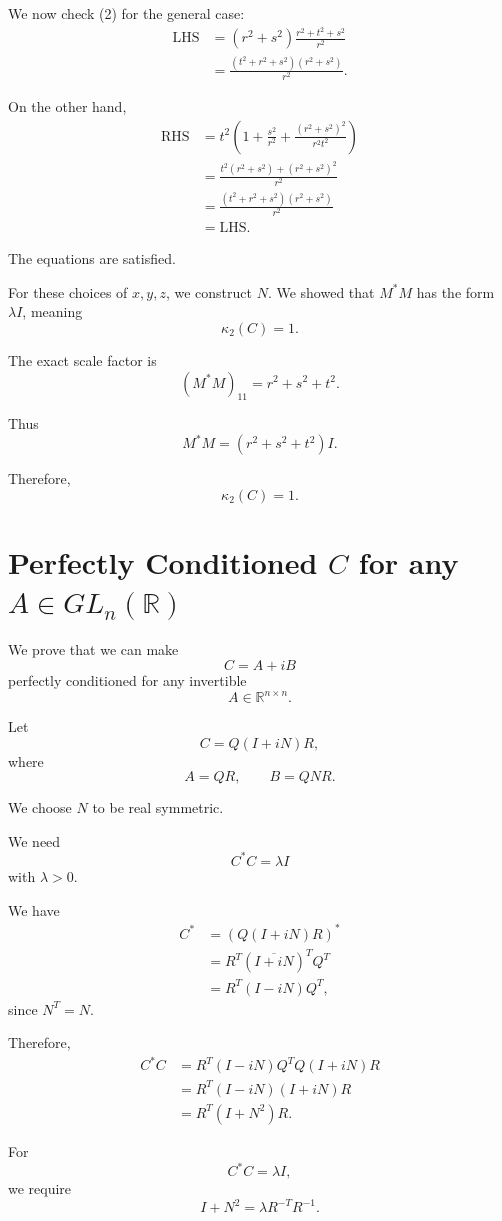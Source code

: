 \documentclass[11pt, reqno, a4paper]{amsart}
\theoremstyle{plain}
\theoremstyle{definition}
\theoremstyle{remark}
\numberwithin{equation}{section}
\begin{document}
We now check (2) for the general case:
\begin{align*}
\text{LHS}
&=
(r^2+s^2)
\frac{r^2+t^2+s^2}{r^2}\\
&=
\frac{(t^2+r^2+s^2)(r^2+s^2)}{r^2}.
\end{align*}

On the other hand,
\begin{align*}
\text{RHS}
&=
t^2\left(
1+\frac{s^2}{r^2}
+\frac{(r^2+s^2)^2}{r^2t^2}
\right)\\
&=
\frac{t^2(r^2+s^2)+(r^2+s^2)^2}{r^2}\\
&=
\frac{(t^2+r^2+s^2)(r^2+s^2)}{r^2}\\
&=\text{LHS}.
\end{align*}

The equations are satisfied.

For these choices of $x,y,z$, we construct $N$. We showed that $M^*M$ has the form $\lambda I$, meaning
\[
\kappa_2(C)=1.
\]

The exact scale factor is
\[
(M^*M)_{11}=r^2+s^2+t^2.
\]

Thus
\[
M^*M=(r^2+s^2+t^2)I.
\]

Therefore,
\[
\boxed{\kappa_2(C)=1.}
\]

\section{Perfectly Conditioned $C$ for any $A\in GL_n(\mathbb{R})$}

We prove that we can make
\[
C=A+iB
\]
perfectly conditioned for any invertible
\[
A\in\mathbb{R}^{n\times n}.
\]

Let
\[
C=Q(I+iN)R,
\]
where
\[
A=QR,\qquad B=QNR.
\]

We choose $N$ to be real symmetric.

We need
\[
C^*C=\lambda I
\]
with $\lambda>0$.

We have
\begin{align*}
C^*
&=(Q(I+iN)R)^*\\
&=R^T(\overline{I+iN})^TQ^T\\
&=R^T(I-iN)Q^T,
\end{align*}
since $N^T=N$.

Therefore,
\begin{align*}
C^*C
&=R^T(I-iN)Q^TQ(I+iN)R\\
&=R^T(I-iN)(I+iN)R\\
&=R^T(I+N^2)R.
\end{align*}

For
\[
C^*C=\lambda I,
\]
we require
\[
I+N^2=\lambda R^{-T}R^{-1}.
\]
\end{document}
